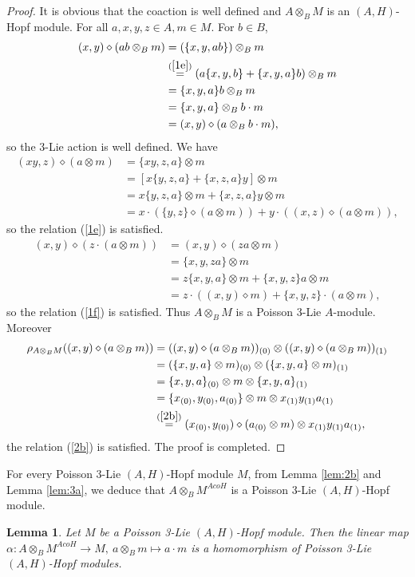 \documentclass[11pt]{article}
\newtheorem{lemma}[theorem]{Lemma}
\def\di{\diamond}
\def\ot{\otimes}
\begin{document}
\begin{proof}
It is obvious that the coaction is well defined and $A\ot_BM$ is an $(A,H)$-Hopf module. For all $a,x,y,z\in A,m\in M$. For $b\in B$,
\begin{align*}
(x,y)\di(ab\ot_Bm)&=(\{x,y,ab\})\ot_Bm\\
&\stackrel{(\ref{1e})}{=}(a\{x,y,b\}+\{x,y,a\}b)\ot_Bm\\
&=\{x,y,a\}b\ot_Bm\\
&=\{x,y,a\}\ot_Bb\cdot m\\
&=(x,y)\di(a\ot_Bb\cdot m),
\end{align*}
so the 3-Lie action is well defined. We have
\begin{align*}
(xy,z)\di(a\ot m)&=\{xy,z,a\}\ot m\\
&=[x\{y,z,a\}+\{x,z,a\}y]\ot m\\
&=x\{y,z,a\}\ot m+\{x,z,a\}y\ot m\\
&=x\cdot(\{y,z\}\di(a\ot m))+y\cdot((x,z)\di(a\ot m)),
\end{align*}
so the relation (\ref{1e}) is satisfied. 
\begin{align*}
(x,y)\di(z\cdot(a\ot m))&=(x,y)\di(za\ot m)\\
&=\{x,y,za\}\ot m\\
&=z\{x,y,a\}\ot m+\{x,y,z\}a\ot m\\
&=z\cdot((x,y)\di m)+\{x,y,z\}\cdot(a\ot m),
\end{align*}
so the relation (\ref{1f}) is satisfied. Thus $A\ot_BM$ is a Poisson 3-Lie $A$-module. Moreover 
\begin{align*}
\rho_{A\ot_BM}((x,y)\di (a\ot_B m))&=((x,y)\di (a\ot_B m))_{(0)}\ot((x,y)\di (a\ot_B m))_{(1)}\\
&=(\{x,y,a\}\ot m)_{(0)}\ot(\{x,y,a\}\ot m)_{(1)}\\
&=\{x,y,a\}_{(0)}\ot m\ot \{x,y,a\}_{(1)}\\
&=\{x_{(0)},y_{(0)},a_{(0)}\}\ot  m\ot x_{(1)}y_{(1)}a_{(1)}\\
&\stackrel{(\ref{2b})}{=}(x_{(0)},y_{(0)})\di(a_{(0)}\ot  m)\ot x_{(1)}y_{(1)}a_{(1)},
\end{align*}
the relation (\ref{2b}) is satisfied. The proof is completed.
\end{proof}


For every Poisson 3-Lie $(A,H)$-Hopf module $M$, from Lemma \ref{lem:2b} and Lemma \ref{lem:3a}, we deduce that $A\ot_BM^{AcoH}$ is a Poisson 3-Lie $(A,H)$-Hopf module.

\begin{lemma}\label{lem:3c}
Let $M$ be a Poisson 3-Lie $(A,H)$-Hopf module. Then the linear map $\alpha:A\ot_B M^{AcoH}\rightarrow M,\ a\ot_Bm\mapsto a\cdot m$ is a homomorphism of Poisson 3-Lie $(A,H)$-Hopf modules.
\end{lemma}
\end{document}
